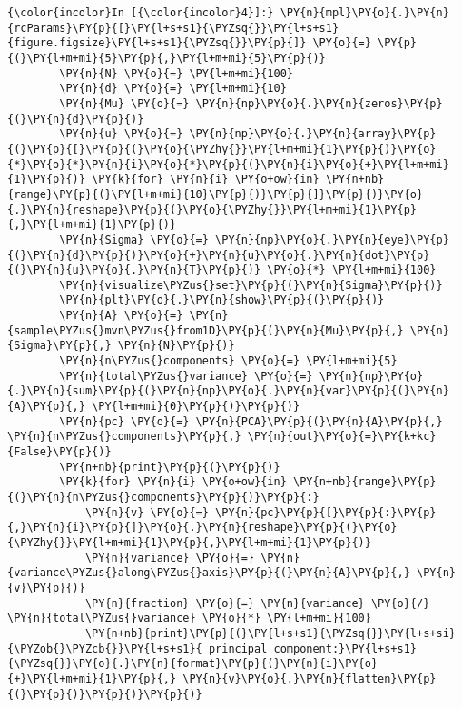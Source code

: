     \begin{Verbatim}[commandchars=\\\{\}]
{\color{incolor}In [{\color{incolor}4}]:} \PY{n}{mpl}\PY{o}{.}\PY{n}{rcParams}\PY{p}{[}\PY{l+s+s1}{\PYZsq{}}\PY{l+s+s1}{figure.figsize}\PY{l+s+s1}{\PYZsq{}}\PY{p}{]} \PY{o}{=} \PY{p}{(}\PY{l+m+mi}{5}\PY{p}{,}\PY{l+m+mi}{5}\PY{p}{)}
        \PY{n}{N} \PY{o}{=} \PY{l+m+mi}{100}
        \PY{n}{d} \PY{o}{=} \PY{l+m+mi}{10}
        \PY{n}{Mu} \PY{o}{=} \PY{n}{np}\PY{o}{.}\PY{n}{zeros}\PY{p}{(}\PY{n}{d}\PY{p}{)}
        \PY{n}{u} \PY{o}{=} \PY{n}{np}\PY{o}{.}\PY{n}{array}\PY{p}{(}\PY{p}{[}\PY{p}{(}\PY{o}{\PYZhy{}}\PY{l+m+mi}{1}\PY{p}{)}\PY{o}{*}\PY{o}{*}\PY{n}{i}\PY{o}{*}\PY{p}{(}\PY{n}{i}\PY{o}{+}\PY{l+m+mi}{1}\PY{p}{)} \PY{k}{for} \PY{n}{i} \PY{o+ow}{in} \PY{n+nb}{range}\PY{p}{(}\PY{l+m+mi}{10}\PY{p}{)}\PY{p}{]}\PY{p}{)}\PY{o}{.}\PY{n}{reshape}\PY{p}{(}\PY{o}{\PYZhy{}}\PY{l+m+mi}{1}\PY{p}{,}\PY{l+m+mi}{1}\PY{p}{)}
        \PY{n}{Sigma} \PY{o}{=} \PY{n}{np}\PY{o}{.}\PY{n}{eye}\PY{p}{(}\PY{n}{d}\PY{p}{)}\PY{o}{+}\PY{n}{u}\PY{o}{.}\PY{n}{dot}\PY{p}{(}\PY{n}{u}\PY{o}{.}\PY{n}{T}\PY{p}{)} \PY{o}{*} \PY{l+m+mi}{100}
        \PY{n}{visualize\PYZus{}set}\PY{p}{(}\PY{n}{Sigma}\PY{p}{)}
        \PY{n}{plt}\PY{o}{.}\PY{n}{show}\PY{p}{(}\PY{p}{)}
        \PY{n}{A} \PY{o}{=} \PY{n}{sample\PYZus{}mvn\PYZus{}from1D}\PY{p}{(}\PY{n}{Mu}\PY{p}{,} \PY{n}{Sigma}\PY{p}{,} \PY{n}{N}\PY{p}{)}
        \PY{n}{n\PYZus{}components} \PY{o}{=} \PY{l+m+mi}{5}
        \PY{n}{total\PYZus{}variance} \PY{o}{=} \PY{n}{np}\PY{o}{.}\PY{n}{sum}\PY{p}{(}\PY{n}{np}\PY{o}{.}\PY{n}{var}\PY{p}{(}\PY{n}{A}\PY{p}{,} \PY{l+m+mi}{0}\PY{p}{)}\PY{p}{)}
        \PY{n}{pc} \PY{o}{=} \PY{n}{PCA}\PY{p}{(}\PY{n}{A}\PY{p}{,} \PY{n}{n\PYZus{}components}\PY{p}{,} \PY{n}{out}\PY{o}{=}\PY{k+kc}{False}\PY{p}{)}
        \PY{n+nb}{print}\PY{p}{(}\PY{p}{)}
        \PY{k}{for} \PY{n}{i} \PY{o+ow}{in} \PY{n+nb}{range}\PY{p}{(}\PY{n}{n\PYZus{}components}\PY{p}{)}\PY{p}{:}
            \PY{n}{v} \PY{o}{=} \PY{n}{pc}\PY{p}{[}\PY{p}{:}\PY{p}{,}\PY{n}{i}\PY{p}{]}\PY{o}{.}\PY{n}{reshape}\PY{p}{(}\PY{o}{\PYZhy{}}\PY{l+m+mi}{1}\PY{p}{,}\PY{l+m+mi}{1}\PY{p}{)}
            \PY{n}{variance} \PY{o}{=} \PY{n}{variance\PYZus{}along\PYZus{}axis}\PY{p}{(}\PY{n}{A}\PY{p}{,} \PY{n}{v}\PY{p}{)}
            \PY{n}{fraction} \PY{o}{=} \PY{n}{variance} \PY{o}{/} \PY{n}{total\PYZus{}variance} \PY{o}{*} \PY{l+m+mi}{100}
            \PY{n+nb}{print}\PY{p}{(}\PY{l+s+s1}{\PYZsq{}}\PY{l+s+si}{\PYZob{}\PYZcb{}}\PY{l+s+s1}{ principal component:}\PY{l+s+s1}{\PYZsq{}}\PY{o}{.}\PY{n}{format}\PY{p}{(}\PY{n}{i}\PY{o}{+}\PY{l+m+mi}{1}\PY{p}{,} \PY{n}{v}\PY{o}{.}\PY{n}{flatten}\PY{p}{(}\PY{p}{)}\PY{p}{)}\PY{p}{)}

\end{Verbatim}
